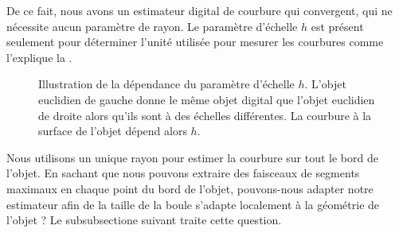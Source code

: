 %
De ce fait, nous avons un estimateur digital de courbure qui convergent, qui ne
nécessite aucun paramètre de rayon. Le paramètre d'échelle $h$ est présent
seulement pour déterminer l'unité utilisée pour mesurer les courbures comme
l'explique la .
%
\begin{figure}[ht]
  \begin{center}
    
  \end{center}
  \caption[Illustration de la dépendance du paramètre d'échelle $h$.]
  {Illustration de la dépendance du paramètre d'échelle $h$. L'objet euclidien
  de gauche donne le même objet digital que l'objet euclidien de droite alors
  qu'ils sont à des échelles différentes. La courbure à la surface de l'objet
  dépend alors $h$.\label{fig:2d-parameter-free-explained}}
\end{figure}
%
Nous utilisons un unique rayon pour estimer la courbure sur tout le bord de
l'objet. En sachant que nous pouvons extraire des faisceaux de segments maximaux
en chaque point du bord de l'objet, pouvons-nous adapter notre estimateur afin
de la taille de la boule s'adapte localement à la géométrie de l'objet ? Le
subsubsectione suivant traite cette question.
%
